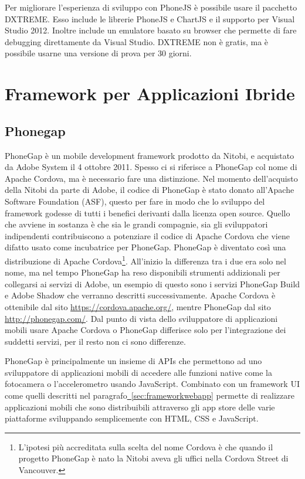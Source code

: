 			Per migliorare l'esperienza di sviluppo con PhoneJS è possibile usare 
			il pacchetto DXTREME. Esso include le librerie PhoneJS e ChartJS e il 
			supporto per Visual Studio 2012. Inoltre include un emulatore basato 
			su browser che permette di fare debugging direttamente da Visual Studio.
			DXTREME non è gratis, ma è possibile usarne una versione di prova per 
			30 giorni.
			
	\section{Framework per Applicazioni Ibride}
	\label{sec:frameworkhybrid}
		\subsection{Phonegap}
			PhoneGap è un mobile development framework prodotto da Nitobi, e 
			acquistato da Adobe System il 4 ottobre 2011.
			Spesso ci si riferisce a PhoneGap col nome di Apache Cordova, ma è 
			necessario fare una distinzione. 
			Nel momento dell'acquisto della Nitobi da parte di Adobe, il codice 
			di PhoneGap è stato donato all'Apache Software Foundation (ASF), 
			questo per fare in modo che lo sviluppo del framework godesse di 
			tutti i benefici derivanti dalla licenza open source.
			Quello che avviene in sostanza è che sia le grandi compagnie, sia 
			gli sviluppatori indipendenti contribuiscono a potenziare il codice 
			di Apache Cordova che viene difatto usato come incubatrice per PhoneGap.
			PhoneGap è diventato così una distribuzione di Apache Cordova\footnote{
			L'ipotesi più accreditata sulla scelta del nome Cordova
			è che quando il progetto PhoneGap è nato la Nitobi aveva gli uffici 
			nella Cordova Street di Vancouver.}. All'inizio la differenza tra 
			i due era solo nel nome, ma nel tempo PhoneGap ha reso disponibili 
			strumenti addizionali per collegarsi ai servizi di Adobe, un esempio 
			di questo sono i servizi PhoneGap Build e Adobe Shadow che verranno 
			descritti successivamente. Apache Cordova è ottenibile dal sito 
			\url{https://cordova.apache.org/}, mentre PhoneGap dal sito 
			\url{http://phonegap.com/}. Dal punto di vista dello sviluppatore di 
			applicazioni mobili usare Apache Cordova o PhoneGap differisce solo 
			per l'integrazione dei suddetti servizi, per il resto non ci sono 
			differenze.
			
			PhoneGap è principalmente un insieme di APIs che permettono ad uno 
			sviluppatore di applicazioni mobili 
			di accedere alle funzioni native come la fotocamera o l'accelerometro 
			usando JavaScript. Combinato con un framework UI come quelli descritti 
			nel paragrafo\hyperref[sec:frameworkwebapp]{~\ref{sec:frameworkwebapp}}
			permette di realizzare applicazioni mobili che sono distribuibili
			attraverso gli app store delle varie piattaforme sviluppando 
			semplicemente con HTML, CSS e JavaScript.

